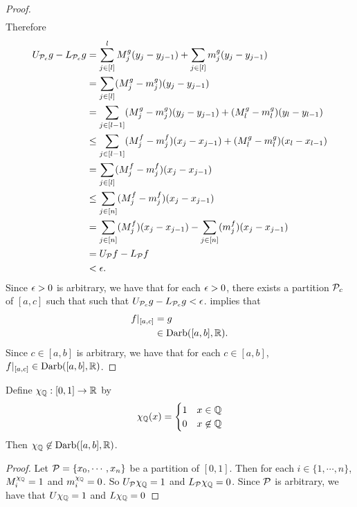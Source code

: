\documentclass{book}
\begin{document}
\begin{proof}
\begin{align*}
		\end{align*}
		Therefore
		\begin{align*}
			U_{\mathcal{P}_c}g - L_{\mathcal{P}_c} g
			& = \sum\limits_{j \in [l]}^l M^g_j (y_j - y_{j-1})  + \sum\limits_{j \in [l]} m^g_j (y_j - y_{j-1}) \\
			& = \sum\limits_{j \in [l]}  (M^g_j - m^g_j) (y_j - y_{j-1}) \\
			& = \sum\limits_{j \in [l-1]}  (M^g_j - m^g_j) (y_j - y_{j-1}) + (M^g_l - m^g_l) (y_l - y_{l-1}) \\
			& \leq \sum\limits_{j \in [l-1]}  (M^f_j - m^f_j) (x_j - x_{j-1}) + (M^g_l - m^g_l) (x_l - x_{l-1}) \\
			& = \sum\limits_{j \in [l]}  (M^f_j - m^f_j) (x_j - x_{j-1}) \\
			& \leq \sum\limits_{j \in [n]}  (M^f_j - m^f_j) (x_j - x_{j-1}) \\
			& = \sum\limits_{j \in [n]}  (M^f_j) (x_j - x_{j-1})  - \sum\limits_{j \in [n]}  (m^f_j) (x_j - x_{j-1}) \\
			& = U_{\mathcal{P}} f - L_{\mathcal{P}} f \\
			& < \epsilon. 
		\end{align*}  
		Since $\epsilon > 0$ is arbitrary, we have that for each $\epsilon > 0$, there exists a partition $\mathcal{P}_c$ of $[a,c]$ such that such that $U_{\mathcal{P}_c} g - L_{\mathcal{P}_c} g < \epsilon$.  implies that 
		\begin{align*}
			f|_{[a,c]}
			& = g \\
			& \in \text{Darb}([a,b], \mathbb{R}).
		\end{align*} 
		Since $c \in [a,b]$ is arbitrary, we have that for each $c \in [a,b]$, $f|_{[a,c]} \in \text{Darb}([a,b], \mathbb{R})$.
 	\end{proof}
 	
	\begin{ex}  
		Define $\chi_{\mathbb{Q}}:[0,1] \rightarrow \mathbb{R}$ by $$\chi_{\mathbb{Q}}(x) = \begin{cases}
			1 & x \in \mathbb{Q} \\
			0 & x \not \in \mathbb{Q}
		\end{cases}$$
		Then $\chi_{\mathbb{Q}} \not \in \text{Darb}([a,b], \mathbb{R})$.
	\end{ex}
	
	\begin{proof}
		Let $\mathcal{P} = \{x_0, \cdots, x_n\}$ be a partition of $[0,1]$. Then for each $i \in \{1, \cdots, n\}$, $M^{\chi_{\mathbb{Q}}}_i = 1$ and $m^{\chi_{\mathbb{Q}}}_i = 0$. So $U_{\mathcal{P}} \chi_{\mathbb{Q}} = 1$ and $L_{\mathcal{P}} \chi_{\mathbb{Q}} = 0$. Since $\mathcal{P}$ is arbitrary, we have that $U \chi_{\mathbb{Q}} = 1$ and $L \chi_{\mathbb{Q}} = 0$
	\end{proof}
	
\end{document}
